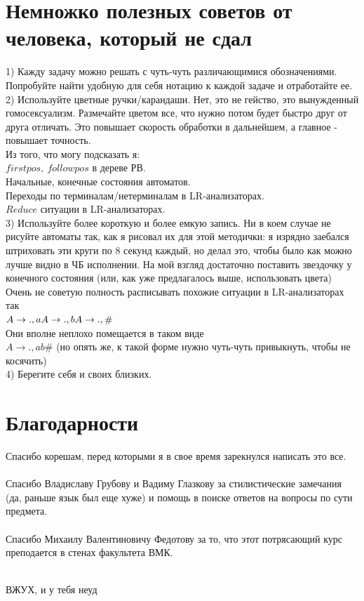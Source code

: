 \documentclass[14pt]{extreport}
\begin{document}
	\chapter{Немножко полезных советов от человека, который не сдал}
	1) Кажду задачу можно решать с чуть-чуть различающимися обозначениями. Попробуйте найти
	удобную для себя нотацию к каждой задаче и отработайте ее.\\
	2) Используйте цветные ручки/карандаши. Нет, это не гейство, это вынужденный гомосексуализм.
	Размечайте цветом все, что нужно потом будет быстро друг от друга отличать. Это повышает
	скорость обработки в дальнейшем, а главное - повышает точность.\\
	Из того, что могу подсказать я:\\
	$firstpos,\ followpos$ в дереве РВ.\\
	Начальные, конечные состояния автоматов.\\
	Переходы по терминалам/нетерминалам в LR-анализаторах.\\
	$Reduce$ ситуации в LR-анализаторах.\\
	3) Используйте более короткую и более емкую запись. Ни в коем случае не рисуйте автоматы так,
	как я рисовал их для этой методички: я изрядно заебался штриховать эти круги по 8 секунд
	каждый, но делал это, чтобы было как можно лучше видно в ЧБ исполнении. На мой взгляд
	достаточно поставить звездочку у конечного состояния (или, как уже предлагалось выше,
	использовать цвета)\\
	Очень не советую полность расписывать похожие ситуации в LR-анализаторах так\\
	$ A \to .,a \\ A \to .,b \\ A \to .,\#$\\
	Они вполне неплохо помещается в таком виде\\
	$A \to .,ab\#$ (но опять же, к такой форме нужно чуть-чуть привыкнуть, чтобы не косячить)\\
	4) Берегите себя и своих близких.
	\chapter{Благодарности}
	Спасибо корешам, перед которыми я в свое время зарекнулся написать это все.\\\\
	Спасибо Владиславу Грубову и Вадиму Глазкову за стилистические замечания (да, раньше
	язык был еще хуже) и помощь в поиске ответов на вопросы по сути предмета.\\\\
	Спасибо Михаилу Валентиновичу Федотову за то, что этот потрясающий курс преподается в
	стенах факультета ВМК.\\\\
	\vspace{270pt}
	\begin{center}
		\large{ВЖУХ, и у тебя неуд}\\	
	\end{center}

	
	
	
	
	
	
	
\end{document}
